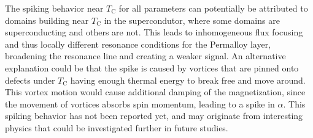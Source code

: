 The spiking behavior near $T_{\textrm{C}}$ for all parameters can potentially be attributed to domains building near $T_{\textrm{C}}$ in the supercondutor, where some domains are superconducting and others are not. This leads to inhomogeneous flux focusing and thus locally different resonance conditions for the Permalloy layer, broadening the resonance line and creating a weaker signal. 
An alternative explanation could be that the spike is caused by vortices that are pinned onto defects under $T_\textrm{C}$ having enough thermal energy to break free and move around. This vortex motion would cause additional damping of the magnetization, since the movement of vortices absorbs spin momentum, leading to a spike in $\alpha$. This spiking behavior has not been reported yet, and may originate from interesting physics that could be investigated further in future studies.


